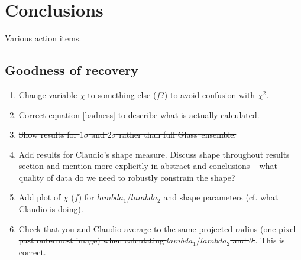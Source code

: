 \documentclass[galley,usenatbib]{mn2e}
\newcommand{\Glass}{{\sc Glass}}
\newcommand{\figref}[1] {Figure~\ref{#1}}
\begin{document}


\section{Conclusions}\label{sec:conclusions}

Various action items.

\subsection{Goodness of recovery}

\begin{enumerate}

  \item \sout{Change variable $\chi$ to something else ($f$?) to avoid confusion with $\chi^2$.}

  \item \sout{Correct equation \eqref{badness} to describe what is actually calculated.}

  \item \sout{Show results for $1\sigma$ and $2\sigma$ rather than full \Glass\ ensemble.}

\item Add results for Claudio's shape measure. Discuss shape
  throughout results section and mention more explicitly in abstract
  and conclusions -- what quality of data do we need to robustly
  constrain the shape?

\item Add plot of $\chi$ ($f$) for $lambda_1/lambda_2$ and shape
  parameters (cf. what Claudio is doing).

\item \sout{Check that you and Claudio average to the same projected radius
  (one pixel past outermost image) when calculating
  $lambda_1/lambda_2$ and $\theta$.}. This is correct.

\end{enumerate}
\end{document}
